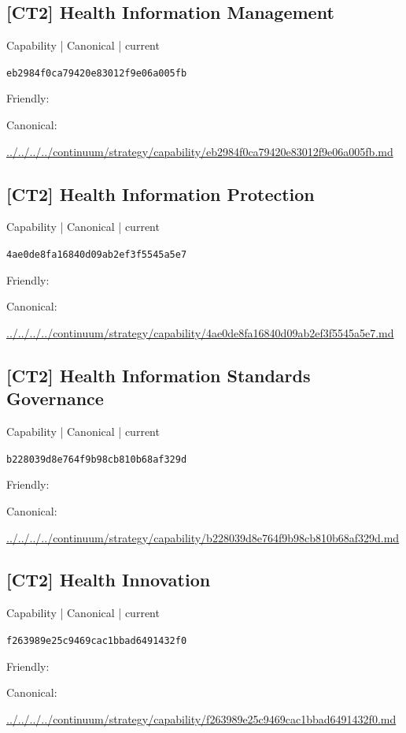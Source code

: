 \documentclass[10pt,a4paper]{article}
\begin{document}
\subsection*{[CT2] Health Information Management}
{\small Capability | Canonical | current}\par
\texttt{eb2984f0ca79420e83012f9e06a005fb}\par
Friendly: \par
Canonical: \par
{\footnotesize\url{../../../../continuum/strategy/capability/eb2984f0ca79420e83012f9e06a005fb.md}}\par
\subsection*{[CT2] Health Information Protection}
{\small Capability | Canonical | current}\par
\texttt{4ae0de8fa16840d09ab2ef3f5545a5e7}\par
Friendly: \par
Canonical: \par
{\footnotesize\url{../../../../continuum/strategy/capability/4ae0de8fa16840d09ab2ef3f5545a5e7.md}}\par
\subsection*{[CT2] Health Information Standards Governance}
{\small Capability | Canonical | current}\par
\texttt{b228039d8e764f9b98cb810b68af329d}\par
Friendly: \par
Canonical: \par
{\footnotesize\url{../../../../continuum/strategy/capability/b228039d8e764f9b98cb810b68af329d.md}}\par
\subsection*{[CT2] Health Innovation}
{\small Capability | Canonical | current}\par
\texttt{f263989e25c9469cac1bbad6491432f0}\par
Friendly: \par
Canonical: \par
{\footnotesize\url{../../../../continuum/strategy/capability/f263989e25c9469cac1bbad6491432f0.md}}\par
\end{document}
